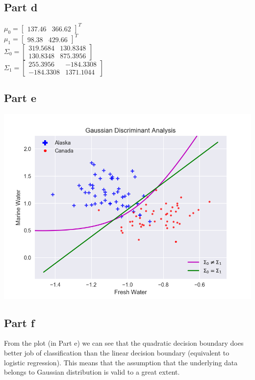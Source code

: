 \documentclass[12pt]{article}
\begin{document}
\subsection*{Part d}
\begin{addmargin}[0.3in]{0in}
$\mu_0 = \begin{bmatrix} 137.46 & 366.62\end{bmatrix}^{T}$ \\
$\mu_1 = \begin{bmatrix} 98.38 & 429.66\end{bmatrix}^{T}$ \\
$\Sigma_0 = 
\begin{bmatrix}
    319.5684 & 130.8348 \\
    130.8348 & 875.3956
\end{bmatrix}$ \\
$\Sigma_1 = 
\begin{bmatrix}
    255.3956 & -184.3308 \\
    -184.3308 & 1371.1044
\end{bmatrix}$
\end{addmargin}
\subsection*{Part e}
\begin{center}
\includegraphics[scale=0.5]{gda3.png}
\end{center}
\subsection*{Part f}
\begin{addmargin}[0.3in]{0in}
From the plot (in Part e) we can see that the quadratic decision boundary does better job of classification than the linear decision boundary (equivalent to logistic regression). This means that the assumption that the underlying data belongs to Gaussian distribution is valid to a great extent.
\end{addmargin}
\end{document}
